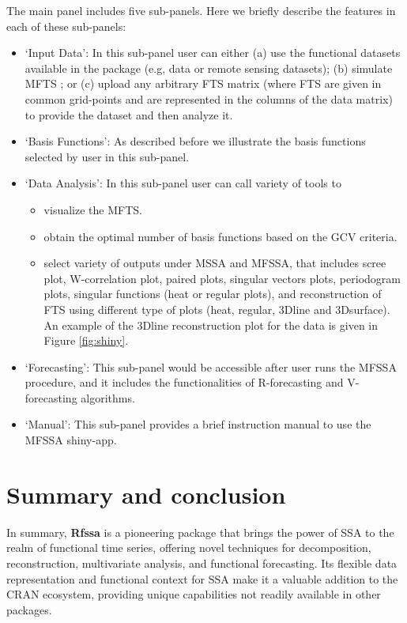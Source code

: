 The main panel includes five sub-panels. Here we briefly describe the features in each of these sub-panels:
\begin{itemize}
\item \textsf{`Input Data'}: In this sub-panel user can either (a) use the functional 
datasets available in the  package (e.g,  data or remote 
sensing datasets); (b) simulate MFTS \citep[see][for details on simulation 
setup]{haghbin2021}; or (c) upload any arbitrary FTS matrix (where FTS are given in 
common grid-points and are represented in the columns of the data matrix) to provide 
the dataset and then analyze it.
\item \textsf{`Basis Functions'}: As described before we illustrate the basis functions selected by user in this sub-panel.
\item \textsf{`Data Analysis'}: In this sub-panel user can call variety of tools to
\begin{itemize}
\item visualize the MFTS.
\item obtain the optimal number of basis functions based on the GCV criteria.
\item select variety of outputs under MSSA and MFSSA, that includes scree plot, W-correlation plot, paired plots, singular vectors plots, periodogram plots, singular functions (heat or regular plots), and reconstruction of FTS using different type of plots (heat, regular, 3Dline and 3Dsurface). An example of the 3Dline reconstruction plot for the  data is given in Figure \ref{fig:shiny}.
\end{itemize}
\item \textsf{`Forecasting'}: This sub-panel would be accessible after user runs the MFSSA procedure, and it includes the functionalities of R-forecasting and V-forecasting algorithms.
\item \textsf{`Manual'}: This sub-panel provides a brief instruction manual to use the MFSSA shiny-app.
\end{itemize}

\section{Summary and conclusion}\label{sec:conclusion}
In summary, \textbf{Rfssa} is a pioneering package that brings the power of SSA to the realm of functional time series, offering novel techniques for decomposition, reconstruction, multivariate analysis, and functional forecasting. Its flexible data representation and functional context for SSA make it a valuable addition to the CRAN ecosystem, providing unique capabilities not readily available in other packages.

